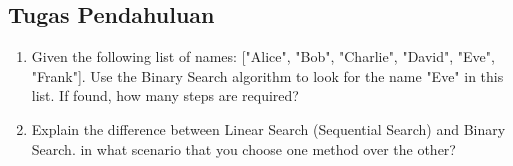 \subsection{Tugas Pendahuluan}
\begin{enumerate}
    \item Given the following list of names: ["Alice", "Bob", "Charlie", "David", "Eve", "Frank"].
    Use the Binary Search algorithm to look for the name "Eve" in this list. If found, how many steps are required?
    \item Explain the difference between Linear Search (Sequential Search) and Binary Search.
    in what scenario that you choose one method over the other?
\end{enumerate}
